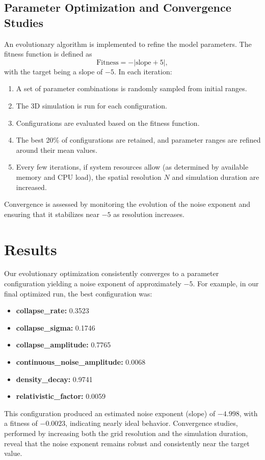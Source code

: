 \documentclass[11pt,a4paper]{article}
\begin{document}
\subsection{Parameter Optimization and Convergence Studies}
An evolutionary algorithm is implemented to refine the model parameters. The fitness function is defined as
\[
\text{Fitness} = -\left|\text{slope} + 5\right|,
\]
with the target being a slope of $-5$. In each iteration:
\begin{enumerate}[label=(\arabic*)]
    \item A set of parameter combinations is randomly sampled from initial ranges.
    \item The 3D simulation is run for each configuration.
    \item Configurations are evaluated based on the fitness function.
    \item The best 20\% of configurations are retained, and parameter ranges are refined around their mean values.
    \item Every few iterations, if system resources allow (as determined by available memory and CPU load), the spatial resolution $N$ and simulation duration are increased.
\end{enumerate}
Convergence is assessed by monitoring the evolution of the noise exponent and ensuring that it stabilizes near $-5$ as resolution increases.

\section{Results}
Our evolutionary optimization consistently converges to a parameter configuration yielding a noise exponent of approximately $-5$. For example, in our final optimized run, the best configuration was:
\begin{itemize}
    \item \textbf{collapse\_rate:} 0.3523
    \item \textbf{collapse\_sigma:} 0.1746
    \item \textbf{collapse\_amplitude:} 0.7765
    \item \textbf{continuous\_noise\_amplitude:} 0.0068
    \item \textbf{density\_decay:} 0.9741
    \item \textbf{relativistic\_factor:} 0.0059
\end{itemize}
This configuration produced an estimated noise exponent (slope) of $-4.998$, with a fitness of $-0.0023$, indicating nearly ideal behavior. Convergence studies, performed by increasing both the grid resolution and the simulation duration, reveal that the noise exponent remains robust and consistently near the target value.
\end{document}
